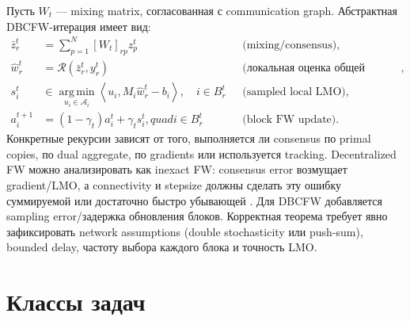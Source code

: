 \documentclass[11pt,a4paper]{article}
\newcommand{\A}{\mathcal{A}}
\newcommand{\ip}[2]{\left\langle #1,#2\right\rangle}
\newcommand{\argmin}{\operatorname*{arg\,min}}
\begin{document}
Пусть \(W_t\) --- mixing matrix, согласованная с communication graph. Абстрактная DBCFW-итерация имеет вид:
\begin{align*}
  \bar z_r^t&=\sum_{p=1}^N[W_t]_{rp}z_p^t
  &&\text{(mixing/consensus)},\\
  \widehat w_r^t&=\mathcal{R}(\bar z_r^t,y_r^t)
  &&\text{(локальная оценка общей модели)},\\
  s_i^t&\in\argmin_{u_i\in\A_i}
  \ip{u_i}{M_i\widehat w_r^t-b_i},\quad i\in B_r^t
  &&\text{(sampled local LMO)},\\
  a_i^{t+1}&=(1-\gamma_t)a_i^t+\gamma_ts_i^t,quad i\in B_r^t
  &&\text{(block FW update)}.
\end{align*}
Конкретные рекурсии зависят от того, выполняется ли consensus по primal copies, по dual aggregate, по gradients или используется tracking. Decentralized FW можно анализировать как inexact FW: consensus error возмущает gradient/LMO, а connectivity и stepsize должны сделать эту ошибку суммируемой или достаточно быстро убывающей \citep{wai2017decentralized}. Для DBCFW добавляется sampling error/задержка обновления блоков. Корректная теорема требует явно зафиксировать network assumptions (double stochasticity или push-sum), bounded delay, частоту выбора каждого блока и точность LMO.

\clearpage
\section{Классы задач}
\end{document}
